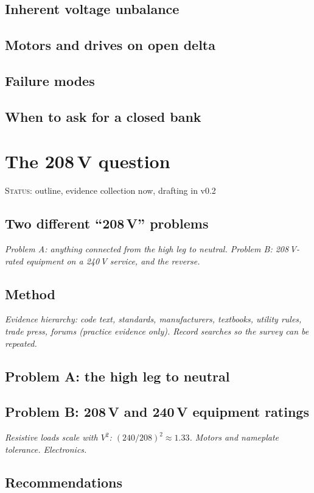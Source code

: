 \documentclass[11pt,a4paper]{article}
\newcommand{\plan}[1]{\par{\small\color{gray}\itshape #1}\par}
\newcommand{\status}[1]{{\small\color{orange!80!black}\textsc{Status:} #1}\par\medskip}
\begin{document}
\subsection{Inherent voltage unbalance}
\subsection{Motors and drives on open delta}
\subsection{Failure modes}
\subsection{When to ask for a closed bank}

\section{The 208\,V question}\label{sec:208v}
\status{outline, evidence collection now, drafting in v0.2}
\subsection{Two different ``208\,V'' problems}
\plan{Problem A: anything connected from the high leg to neutral. Problem B: 208\,V-rated equipment on a 240\,V service, and the reverse.}
\subsection{Method}
\plan{Evidence hierarchy: code text, standards, manufacturers, textbooks, utility rules, trade press, forums (practice evidence only). Record searches so the survey can be repeated.}
\subsection{Problem A: the high leg to neutral}
\subsection{Problem B: 208\,V and 240\,V equipment ratings}
\plan{Resistive loads scale with $V^2$: $(240/208)^2 \approx 1.33$. Motors and nameplate tolerance. Electronics.}
\subsection{Recommendations}
\end{document}
